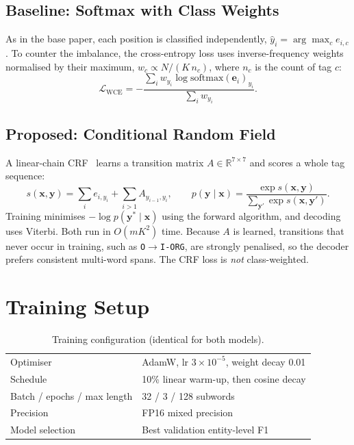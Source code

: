 \subsection{Baseline: Softmax with Class Weights}

As in the base paper, each position is classified independently,
$\hat{y}_i = \arg\max_c e_{i,c}$. To counter the imbalance, the
cross-entropy loss uses inverse-frequency weights normalised by their
maximum, $w_c \propto N / (K\, n_c)$, where $n_c$ is the count of tag $c$:
\begin{equation}\label{eq:wce}
\mathcal{L}_{\mathrm{WCE}} = -\frac{\sum_{i} w_{y_i} \log \mathrm{softmax}(\mathbf{e}_i)_{y_i}}{\sum_{i} w_{y_i}}.
\end{equation}

\subsection{Proposed: Conditional Random Field}

A linear-chain CRF~\cite{lafferty2001conditional} learns a
transition matrix $A \in \mathbb{R}^{7 \times 7}$ and scores a whole tag
sequence:
\begin{equation}
s(\mathbf{x}, \mathbf{y}) = \sum_{i} e_{i, y_i} + \sum_{i>1} A_{y_{i-1}, y_i}, \qquad
p(\mathbf{y} \mid \mathbf{x}) = \frac{\exp s(\mathbf{x}, \mathbf{y})}{\sum_{\mathbf{y}'} \exp s(\mathbf{x}, \mathbf{y}')}.
\end{equation}
Training minimises $-\log p(\mathbf{y}^{\ast} \mid \mathbf{x})$ using the
forward algorithm, and decoding uses Viterbi. Both run in $O(mK^2)$ time.
Because $A$ is learned, transitions that never occur in training, such as
\texttt{O}$\rightarrow$\texttt{I-ORG}, are strongly penalised, so the
decoder prefers consistent multi-word spans. The CRF loss is \emph{not}
class-weighted.

\section{Training Setup}

\begin{table}[H]
\centering
\caption{Training configuration (identical for both models).}
\label{tab:hparams}
\begin{tabular}{ll}
\toprule
Optimiser & AdamW, lr $3\times10^{-5}$, weight decay 0.01 \\
Schedule & 10\% linear warm-up, then cosine decay \\
Batch / epochs / max length & 32 / 3 / 128 subwords \\
Precision & FP16 mixed precision \\
Model selection & Best validation entity-level F1 \\
\bottomrule
\end{tabular}
\end{table}

